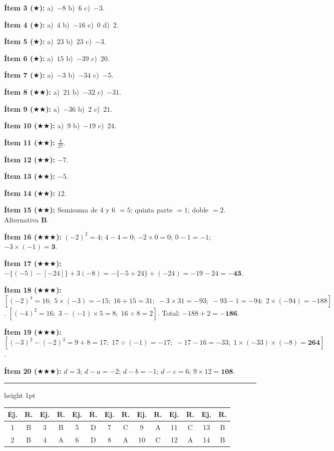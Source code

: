 \documentclass[11pt, letterpaper]{article}
\newcommand{\subbloque}[1]{%
  \vspace{14pt}
  \noindent{\large\bfseries\color{zenitnavy} #1}\par
  \vspace{4pt}\hrule height 1pt\vspace{8pt}}
\begin{document}
\textbf{\'Item 3 ($\bigstar$):} a)~$-8$ \; b)~$6$ \; c)~$-3$.

\textbf{\'Item 4 ($\bigstar$):} a)~$4$ \; b)~$-16$ \; c)~$0$ \; d)~$2$.

\textbf{\'Item 5 ($\bigstar$):} a)~$23$ \; b)~$23$ \; c)~$-3$.

\textbf{\'Item 6 ($\bigstar$):} a)~$15$ \; b)~$-39$ \; c)~$20$.

\textbf{\'Item 7 ($\bigstar$):} a)~$-3$ \; b)~$-34$ \; c)~$-5$.

\textbf{\'Item 8 ($\bigstar\bigstar$):} a)~$21$ \; b)~$-32$ \; c)~$-31$.

\textbf{\'Item 9 ($\bigstar\bigstar$):} a)~$-36$ \; b)~$2$ \; c)~$21$.

\textbf{\'Item 10 ($\bigstar\bigstar$):} a)~$9$ \; b)~$-19$ \; c)~$24$.

\textbf{\'Item 11 ($\bigstar\bigstar$):} $\frac{4}{27}$.

\textbf{\'Item 12 ($\bigstar\bigstar$):} $-7$.

\textbf{\'Item 13 ($\bigstar\bigstar$):} $-5$.

\textbf{\'Item 14 ($\bigstar\bigstar$):} $12$.

\textbf{\'Item 15 ($\bigstar\bigstar$):} Semisuma de 4 y 6 $=5$; quinta parte $=1$; doble $=2$. Alternativa \textbf{B}.

\textbf{\'Item 16 ($\bigstar\bigstar\bigstar$):} $(-2)^2=4$; $4-4=0$; $-2\times 0=0$; $0-1=-1$; $-3\times(-1)=\mathbf{3}$.

\textbf{\'Item 17 ($\bigstar\bigstar\bigstar$):} $-\{(-5)-[-24]\}+3(-8)=-\{-5+24\}+(-24)=-19-24=\mathbf{-43}$.

\textbf{\'Item 18 ($\bigstar\bigstar\bigstar$):} $[(-2)^4=16;\;5\times(-3)=-15;\;16+15=31;\;-3\times 31=-93;\;-93-1=-94;\;2\times(-94)=-188]$. $[(-4)^2=16;\;3-(-1)\times 5=8;\;16\div 8=2]$. Total: $-188+2=\mathbf{-186}$.

\textbf{\'Item 19 ($\bigstar\bigstar\bigstar$):} $[(-3)^2-(-2)^3=9+8=17;\;17\div(-1)=-17;\;-17-16=-33;\;1\times(-33)\times(-8)=\mathbf{264}]$.

\textbf{\'Item 20 ($\bigstar\bigstar\bigstar$):} $d=3$; $d-a=-2$; $d-b=-1$; $d-c=6$; $9\times 12=\mathbf{108}$.

\subbloque{Ejercicios tipo PAES}

\begin{center}
\renewcommand{\arraystretch}{1.3}
\begin{tabular}{c|c||c|c||c|c||c|c||c|c||c|c||c|c}
\toprule
\textbf{Ej.} & \textbf{R.} & \textbf{Ej.} & \textbf{R.} & \textbf{Ej.} & \textbf{R.} & \textbf{Ej.} & \textbf{R.} & \textbf{Ej.} & \textbf{R.} & \textbf{Ej.} & \textbf{R.} & \textbf{Ej.} & \textbf{R.}\\
\midrule
1 & B & 3 & B & 5 & D & 7 & C & 9 & A & 11 & C & 13 & B\\
2 & B & 4 & A & 6 & D & 8 & A & 10 & C & 12 & A & 14 & B\\
\bottomrule
\end{tabular}
\end{center}
\end{document}

